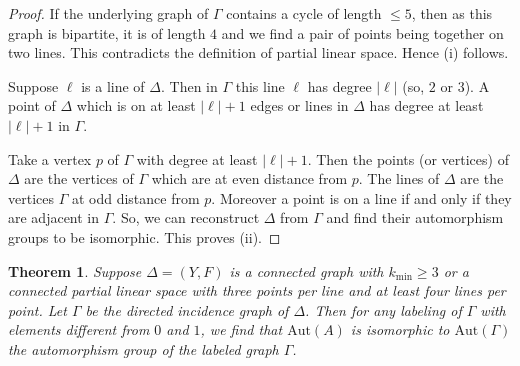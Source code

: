 \documentclass[oneside,a4paper]{amsart} %
\newtheorem{theorem}[proposition]{Theorem}
\theoremstyle{definition}
\begin{document}
\begin{proof}
If the underlying graph of  $\Gamma$ contains a cycle of length $\leq 5$, then as this graph is bipartite, it is of length $4$ and
we find a pair of points being together on two lines. This contradicts the definition of partial linear space.
Hence (i) follows.

Suppose $\ell$ is a line of $\Delta$. Then in $\Gamma$ this line $\ell$ has degree $|\ell|$ (so, $2$ or $3$).
A point  of $\Delta$ which is on at least $|\ell|+1$ edges or lines in $\Delta$ has degree at least $|\ell|+1$ in $\Gamma$.

Take a vertex $p$ of $\Gamma$ with degree at least $|\ell|+1$. Then the points (or vertices) of $\Delta$ are the vertices of 
$\Gamma$ which are at even distance from $p$. The lines of $\Delta$ are the vertices $\Gamma$ at odd distance from $p$.
Moreover a point is on a line if and only if they are adjacent in $\Gamma$.
So, we can reconstruct $\Delta$ from $\Gamma$ and find their automorphism groups to be isomorphic. This proves (ii).
\end{proof}


\begin{theorem}\label{autgroupthm2}
Suppose $\Delta=(Y,F)$ is a connected graph with  $k_{\mathrm{min}}\geq 3$ or a connected 
partial linear space with three points per line and at least four lines per point.
Let $\Gamma$ be the directed incidence graph of $\Delta$.
Then for any labeling of $\Gamma$ with elements different from $0$ and $1$, 
we find  that $\mathrm{Aut}(A)$ is isomorphic to $\mathrm{Aut}(\Gamma)$ the automorphism group of the labeled graph $\Gamma$.
\end{theorem}
\end{document}
